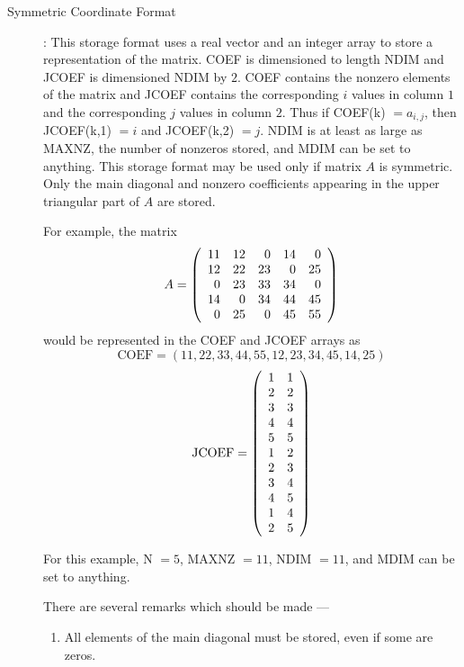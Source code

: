 \begin{description}
\newpage
\item[Symmetric Coordinate Format]:
  This storage format uses a real vector and an integer array
  to store a representation of the matrix.  COEF is dimensioned
  to length NDIM and JCOEF is dimensioned NDIM by $2$.
  COEF contains the nonzero elements of the matrix and JCOEF
  contains the corresponding $i$ values in column $1$ and the
  corresponding $j$ values in column $2$.  Thus if
  COEF(k) $= a_{i,j}$, then JCOEF(k,1) $=i$ and JCOEF(k,2) $=j$.
  NDIM is at least as large as MAXNZ, the number of nonzeros
  stored, and MDIM can be set to anything.
  This storage format may be used only if matrix $A$ is symmetric.
  Only the main diagonal and nonzero coefficients appearing in the
  upper triangular part of $A$ are stored.
 
  For example, the matrix
  \[
     A = \left( \begin{array}{rrrrr}
                 11 & 12 &  0 & 14 &  0 \\
                 12 & 22 & 23 &  0 & 25 \\
                  0 & 23 & 33 & 34 &  0 \\
                 14 &  0 & 34 & 44 & 45 \\
                  0 & 25 &  0 & 45 & 55
        \end{array} \right)
  \]
  would be represented in the COEF and JCOEF arrays as
  \[
     \mbox{COEF} = (11,22,33,44,55,12,23,34,45,14,25)
  \]
  \[
     \mbox{JCOEF} = \left( \begin{array}{cc}
             1 & 1 \\
             2 & 2 \\
             3 & 3 \\
             4 & 4 \\
             5 & 5 \\
             1 & 2 \\
             2 & 3 \\
             3 & 4 \\
             4 & 5 \\
             1 & 4 \\
             2 & 5
      \end{array} \right)
  \]
 
  For this example, N $=5$, MAXNZ $=11$, NDIM $=11$, and MDIM can
  be set to anything.
 
  There are several remarks which should be made ---
  \begin{enumerate}
  \item
       All elements of the main diagonal must be stored, even if
       some are zeros.
 

\end{enumerate}
\end{description}
